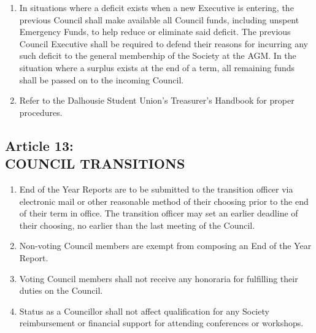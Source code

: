 \documentclass[]{report}
\begin{document}
\begin{enumerate}
		\item In situations where a deficit exists when a new Executive is entering, the previous Council shall make available all Council funds, including unspent Emergency Funds, to help reduce or eliminate said deficit. The previous Council Executive shall be required to defend their reasons for incurring any such deficit to the general membership of the Society at the AGM. In the situation where a surplus exists at the end of a term, all remaining funds shall be passed on to the incoming Council.
		
		\item Refer to the Dalhousie Student Union's Treasurer's Handbook for proper procedures.
	
	\end{enumerate}


\clearpage
\begin{center}
	\section*{Article 13:\\COUNCIL TRANSITIONS}
	\vspace{12px}
\end{center}
\label{}

	\renewcommand{\theenumi}{\Alph{enumi}}
	\begin{enumerate}
	
		\item End of the Year Reports are to be submitted to the transition officer via electronic mail or other reasonable method of their choosing prior to the end of their term in office. The transition officer may set an earlier deadline of their choosing, no earlier than the last meeting of the Council.
		
		\item Non-voting Council members are exempt from composing an End of the Year Report.
		
		\item Voting Council members shall not receive any honoraria for fulfilling their duties on the Council.
		
		\item Status as a Councillor shall not affect qualification for any Society reimbursement or financial support for attending conferences or workshops.
		
	\end{enumerate}
\end{document}
